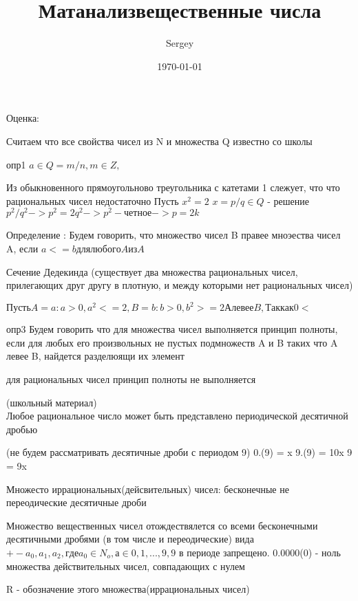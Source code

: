 \documentclass[a4paper]{article}
\author{Sergey}
\title{Матанализ}
\date{\today}
\begin{document}
\maketitle

\newpage

Оценка:\\

\title{вещественные числа}

Считаем что все свойства чисел из N и множества Q известно со школы

опр1 $a\in Q = m/n, m\in Z, $


Из обыкновенного прямоугольново треугольника с катетами 1 слежует, что что рациональных чисел недостаточно
Пусть
$x^2 = 2$
$x = p/q \in Q$ - решение
$p^2/q^2 -> p^2 = 2q^2 ->p^2 - четное ->p=2k$


Определение : Будем говорить, что множество чисел B правее мноэества чисел A, если $a <= b  для любого A из A$





Сечение Дедекинда
(существует два множества рациональных чисел, прилегающих друг другу в плотную, и между которыми нет рациональных чисел)

$Пусть A = {a: a>0, a^2 <= 2}, B = {b: b>0, b^2 >= 2}
А левее B, Так как 0<
$


опр3
Будем говорить что для множества чисел выполняется принцип полноты, если для любых его произвольных не пустых подмножеств A и B таких что A левее B, найдется разделюящи	 их элемент

для рациональных чисел принцип полноты не выполняется



(школьный материал)\\

Любое рациональное число может быть представлено периодической десятичной дробью


(не будем рассматривать десятичные дроби с периодом 9)
0.(9) = x
9.(9) = 10x
9 = 9x



Множесто иррациональных(дейсвительных) чисел:
бесконечные не переодические десятичные дроби

Множество вещественных чисел отождествялется со всеми бесконечными десятичными дробями (в том числе и переодические) вида$ +- a_0, a_1, a_2, где a_0 \in N_o, а \in {0, 1, ..., 9}, 9$ в периоде запрещено.
0.0000(0) - ноль множества действительных чисел, совпадающих с нулем

R - обозначение этого множества(иррациональных чисел)
\end{document}
